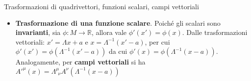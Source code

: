 \documentclass[a4_2,grid,frame]{flashcards}
\newenvironment{cartaflash}
    {\vspace{-15pt}
    \begin{itemize}
    }
    {
    \end{itemize}
    }
\begin{document}
\begin{flashcard}[Trasformazioni]{Trasformazioni di quadrivettori, funzioni scalari, campi vettoriali}
\begin{cartaflash}
\[\vspace{-8pt}
\]
Dove $\Lambda_\mu^{\>\>\sigma} = g_{\mu\nu}\Lamnda^\nu_{\>\>\rho} g^{\rho\sigma}$. Si può estrarre una relazione su di essa a partire dalla pseudortogonalità, moltiplicando per $g^{\sigma\tau}$ entrambi i membri in modo da ottenere $\Lambda^\mu_{\>\>\rho} \Lambda_\mu^{\>\>\tau} = \delta^\tau_{\>\>\rho}$, da cui $\Lambda_\mu^{\>\>\tau} = (\Lambda^{-1})^\tau_{\>\>\mu}$ (matrici inverse). 
\vspace{-8pt}
\item \textbf{Trasformazione di una funzione scalare}. Poiché gli scalari sono \textbf{invarianti}, sia $\phi:M \to \mathbb{R}$, allora vale $\phi'(x') = \phi(x)$. Dalle trasformazioni vettoriali: $x' = \Lambda x + a$ e $x = \Lambda^{-1}(x'-a)$, per cui $\phi'(x') = \phi(\Lambda^{-1}(x'-a))$ da cui $\phi'(x) = \phi(\Lambda^{-1}(x-a))$. %
Analogamente, per \textbf{campi vettoriali} si ha $A'^\mu(x) = \Lambda^\mu_{\>\>\nu} A^\nu (\Lambda^{-1}(x-a))$
\end{cartaflash}
\end{flashcard}

\end{document}
